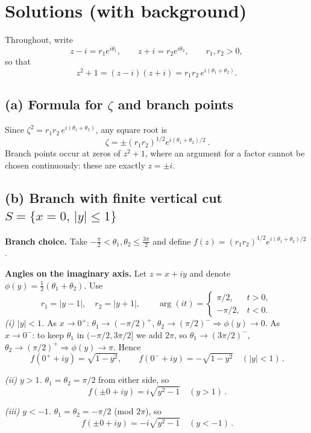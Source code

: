 \documentclass[11pt]{article}
\begin{document}
	\section*{Solutions (with background)}
	
	Throughout, write
	\[
	z-i=r_{1}e^{i\theta_{1}},\qquad z+i=r_{2}e^{i\theta_{2}},\qquad r_{1},r_{2}>0,
	\]
	so that
	\[
	z^{2}+1=(z-i)(z+i)=r_{1}r_{2}\,e^{i(\theta_{1}+\theta_{2})}.
	\]
	
	\subsection*{(a) Formula for \(\zeta\) and branch points}
	Since \(\zeta^{2}=r_{1}r_{2}\,e^{i(\theta_{1}+\theta_{2})}\), any square root is
	\[
	\boxed{\ \zeta=\pm(r_{1}r_{2})^{1/2}e^{i(\theta_{1}+\theta_{2})/2}\ }.
	\]
	Branch points occur at zeros of \(z^{2}+1\), where an argument for a factor cannot be chosen continuously:
	these are exactly \(z=\pm i\).
	
	\subsection*{(b) Branch with finite vertical cut \(S=\{x=0,\,|y|\le 1\}\)}
	
	\textbf{Branch choice.} Take \(-\frac{\pi}{2}<\theta_{1},\theta_{2}\le \frac{3\pi}{2}\) and define
	\(f(z)=(r_{1}r_{2})^{1/2}e^{i(\theta_{1}+\theta_{2})/2}\).
	
	\textbf{Angles on the imaginary axis.} Let \(z=x+iy\) and denote
	\(\phi(y)=\tfrac12(\theta_{1}+\theta_{2})\).
	Use
	\[
	r_{1}=|y-1|,\quad r_{2}=|y+1|,\qquad
	\arg(i t)=\begin{cases}\pi/2,&t>0,\\ -\pi/2,&t<0.\end{cases}
	\]
	\emph{(i) \(|y|<1\).}
	As \(x\to 0^{+}\): \(\theta_{1}\to (-\pi/2)^{+}\), \(\theta_{2}\to (\pi/2)^{-}\Rightarrow \phi(y)\to 0\).
	As \(x\to 0^{-}\): to keep \(\theta_{1}\) in \((-\pi/2,3\pi/2]\) we add \(2\pi\),
	so \(\theta_{1}\to (3\pi/2)^{-}\), \(\theta_{2}\to(\pi/2)^{+}\Rightarrow \phi(y)\to \pi\).
	Hence
	\[
	\boxed{\,f(0^{+}+iy)=\sqrt{1-y^{2}},\qquad f(0^{-}+iy)=-\sqrt{1-y^{2}}\quad(|y|<1)\, }.
	\]
	
	\emph{(ii) \(y>1\).}
	\(\theta_{1}=\theta_{2}=\pi/2\) from either side, so
	\[
	\boxed{\,f(\pm 0+iy)= i\sqrt{y^{2}-1}\quad(y>1)\, }.
	\]
	
	\emph{(iii) \(y<-1\).}
	\(\theta_{1}=\theta_{2}=-\pi/2\) (mod \(2\pi\)), so
	\[
	\boxed{\,f(\pm 0+iy)= -i\sqrt{y^{2}-1}\quad(y<-1)\, }.
	\]
	
\end{document}
